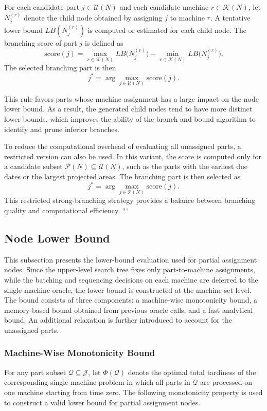 \documentclass[letterpaper, 10 pt, conference]{ieeeconf}  %
\begin{document}
For each candidate part $j\in\mathcal{U}(N)$ and each candidate machine
$r\in\mathcal{K}(N)$, let $N_j^{(r)}$ denote the child node obtained by
assigning $j$ to machine $r$. A tentative lower bound $LB(N_j^{(r)})$ is
computed or estimated for each child node. The branching score of part $j$
is defined as
\[
\mathrm{score}(j)
=
\max_{r\in\mathcal{K}(N)} LB\bigl(N_j^{(r)}\bigr)
-
\min_{r\in\mathcal{K}(N)} LB\bigl(N_j^{(r)}\bigr).
\]
The selected branching part is then
\[
j^*=\arg\max_{j\in\mathcal{U}(N)} \mathrm{score}(j).
\]

This rule favors parts whose machine assignment has a large impact on the
node lower bound. As a result, the generated child nodes tend to have more
distinct lower bounds, which improves the ability of the branch-and-bound
algorithm to identify and prune inferior branches.

To reduce the computational overhead of evaluating all unassigned parts, a
restricted version can also be used. In this variant, the score is computed
only for a candidate subset $\mathcal{P}(N)\subseteq\mathcal{U}(N)$, such as
the parts with the earliest due dates or the largest projected areas. The
branching part is then selected as
\[
j^*=\arg\max_{j\in\mathcal{P}(N)} \mathrm{score}(j).
\]
This restricted strong-branching strategy provides a balance between
branching quality and computational efficiency.
```


\subsection{Node Lower Bound}
\label{subsec:node_lb}

This subsection presents the lower-bound evaluation used for partial
assignment nodes. Since the upper-level search tree fixes only
part-to-machine assignments, while the batching and sequencing decisions on
each machine are deferred to the single-machine oracle, the lower bound is
constructed at the machine-set level. The bound consists of three components:
a machine-wise monotonicity bound, a memory-based bound obtained from
previous oracle calls, and a fast analytical bound. An additional relaxation
is further introduced to account for the unassigned parts.

\subsubsection{Machine-Wise Monotonicity Bound}

For any part subset $\mathcal{Q}\subseteq\mathcal{J}$, let
$\Phi(\mathcal{Q})$ denote the optimal total tardiness of the corresponding
single-machine problem in which all parts in $\mathcal{Q}$ are processed on
one machine starting from time zero. The following monotonicity property is
used to construct a valid lower bound for partial assignment nodes.
\end{document}
